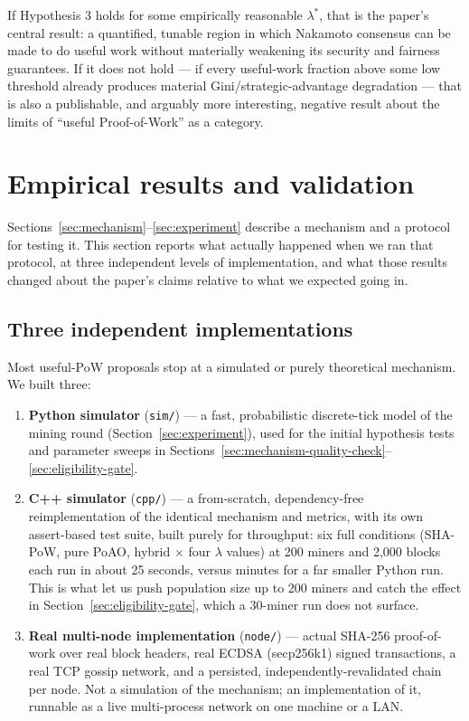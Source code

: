 \documentclass[journal]{IEEEtran}
\begin{document}
If Hypothesis 3 holds for some empirically reasonable $\lambda^\ast$, that is
the paper's central result: a quantified, tunable region in which Nakamoto
consensus can be made to do useful work without materially weakening its
security and fairness guarantees. If it does not hold --- if every
useful-work fraction above some low threshold already produces material
Gini/strategic-advantage degradation --- that is also a publishable, and
arguably more interesting, negative result about the limits of ``useful
Proof-of-Work'' as a category.

\section{Empirical results and validation}
\label{sec:results}

Sections~\ref{sec:mechanism}--\ref{sec:experiment} describe a mechanism and
a protocol for testing it. This section reports what actually happened when
we ran that protocol, at three independent levels of implementation, and
what those results changed about the paper's claims relative to what we
expected going in.

\subsection{Three independent implementations}
\label{sec:implementations}

Most useful-PoW proposals stop at a simulated or purely theoretical
mechanism. We built three:

\begin{enumerate}[nosep]
\item \textbf{Python simulator} (\texttt{sim/}) --- a fast, probabilistic
discrete-tick model of the mining round (Section~\ref{sec:experiment}),
used for the initial hypothesis tests and parameter sweeps in
Sections~\ref{sec:mechanism-quality-check}--\ref{sec:eligibility-gate}.
\item \textbf{C++ simulator} (\texttt{cpp/}) --- a from-scratch,
dependency-free reimplementation of the identical mechanism and metrics,
with its own assert-based test suite, built purely for throughput: six full
conditions (SHA-PoW, pure PoAO, hybrid $\times$ four $\lambda$ values) at
200 miners and 2{,}000 blocks each run in about 25 seconds, versus minutes
for a far smaller Python run. This is what let us push population size up
to 200 miners and catch the effect in Section~\ref{sec:eligibility-gate},
which a 30-miner run does not surface.
\item \textbf{Real multi-node implementation} (\texttt{node/}) --- actual
SHA-256 proof-of-work over real block headers, real ECDSA (secp256k1)
signed transactions, a real TCP gossip network, and a persisted,
independently-revalidated chain per node. Not a simulation of the
mechanism; an implementation of it, runnable as a live multi-process
network on one machine or a LAN.
\end{enumerate}
\end{document}
